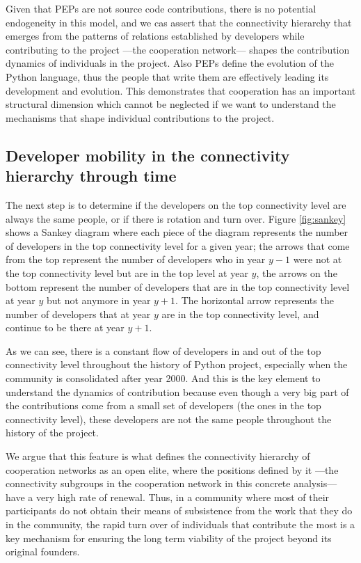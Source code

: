 Given that PEPs are not source code contributions, there is no potential endogeneity in this model, and we cas assert that the connectivity hierarchy that emerges from the patterns of relations established by developers while contributing to the project ---the cooperation network--- shapes the contribution dynamics of individuals in the project. Also PEPs define the evolution of the Python language, thus the people that write them are effectively leading its development and evolution. This demonstrates that cooperation has an important structural dimension which cannot be neglected if we want to understand the mechanisms that shape individual contributions to the project.

\subsection{Developer mobility in the connectivity hierarchy through time}

The next step is to determine if the developers on the top connectivity level are always the same people, or if there is rotation and turn over. Figure \ref{fig:sankey} shows a Sankey diagram where each piece of the diagram represents the number of developers in the top connectivity level for a given year; the arrows that come from the top represent the number of developers who in year $y - 1$ were not at the top connectivity level but are in the top level at year $y$, the arrows on the bottom represent the number of developers that are in the top connectivity level at year $y$ but not anymore in year $y + 1$. The horizontal arrow represents the number of developers that at year $y$ are in the top connectivity level, and continue to be there at year $y + 1$.

As we can see, there is a constant flow of developers in and out of the top connectivity level throughout the history of Python project, especially when the community is consolidated after year 2000. And this is the key element to understand the dynamics of contribution because even though a very big part of the contributions come from a small set of developers (the ones in the top connectivity level), these developers are not the same people throughout the history of the project.

We argue that this feature is what defines the connectivity hierarchy of cooperation networks as an open elite, where the positions defined by it ---the connectivity subgroups in the cooperation network in this concrete analysis--- have a very high rate of renewal. Thus, in a community where most of their participants do not obtain their means of subsistence from the work that they do in the community, the rapid turn over of individuals that contribute the most is a key mechanism for ensuring the long term viability of the project beyond its original founders.


